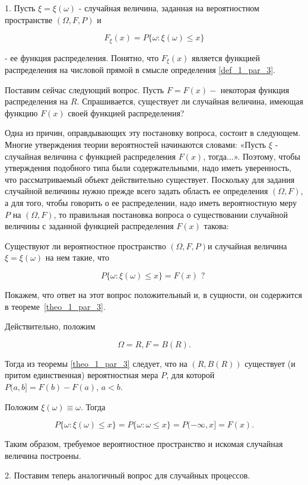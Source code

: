 1. Пусть $\xi=\xi(\omega)$ - случайная величина, заданная на вероятностном пространстве $(\Omega, {F}, P)$ и

$$
F_{\xi}(x)={P}\{\omega: \xi(\omega) \leqslant x\}
$$

- ее функция распределения. Понятно, что $F_{\xi}(x)$ является функцией распределения на числовой прямой в смысле определения \ref{def_1_par_3}.

Поставим сейчас следующий вопрос. Пусть $F=F(x)-$ некоторая функция распределения на $R$. Спрашивается, существует ли случайная величина, имеющая функцию $F(x)$ своей функцией распределения?

Одна из причин, оправдывающих эту постановку вопроса, состоит в следующем. Многие утверждения теории вероятностей начинаются словами: «Пусть $\xi$ - случайная величина с функцией распределения $F(x)$, тогда...». Поэтому, чтобы утверждения подобного типа были содержательными, надо иметь уверенность, что рассматриваемый объект действительно существует. Поскольку для задания случайной величины нужно прежде всего задать область ее определения $(\Omega, {F})$, а для того, чтобы говорить о ее распределении, надо иметь вероятностную меру ${P}$ на $(\Omega, {F})$, то правильная постановка вопроса о существовании случайной величины с заданной функцией распределения $F(x)$ такова:

Существуют ли вероятностное пространство  $(\Omega, {F}, {P})$и случайная величина $\xi=\xi(\omega)$ на нем такие, что

$$
{P}\{\omega: \xi(\omega) \leqslant x\}=F(x) \text { ? }
$$

Покажем, что ответ на этот вопрос положительный и, в сущности, он содержится в теореме~\ref{theo_1_par_3}.

Действительно, положим

$$
\Omega=R, {F}={B}(R) .
$$

Тогда из теоремы \ref{theo_1_par_3} следует, что на $(R, {B}(R))$ существует (и притом единственная) вероятностная мера ${P}$, для которой ${P}(a, b]=F(b)-F(a)$, $a<b$.

Положим $\xi(\omega) \equiv \omega$. Тогда

$$
{P}\{\omega: \xi(\omega) \leqslant x\}={P}\{\omega: \omega \leqslant x\}={P}(-\infty, x]=F(x) .
$$

Таким образом, требуемое вероятностное пространство и искомая случайная величина построены.

2. Поставим теперь аналогичный вопрос для случайных процессов.

